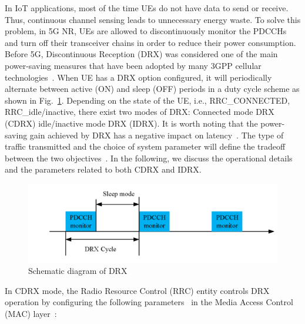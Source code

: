 \documentclass[]{IEEEtran}
\begin{document}
In IoT applications, most of the time UEs do not have data to send or receive. Thus, continuous channel sensing leads to unnecessary energy waste. 
To solve this problem, in 5G NR, UEs are allowed to discontinuously monitor the PDCCHs and turn off their transceiver chains in order to reduce their power consumption. 
Before 5G, Discontinuous Reception (DRX) was considered one of the main power-saving measures that have been adopted by many 3GPP cellular technologies~\cite{TS_36.321, TS_36.304}.
When UE has a DRX option configured, it will periodically alternate between active (ON) and sleep (OFF) periods in a duty cycle scheme as shown in Fig.~\ref{fig:5g-drx}. 
Depending on the state of the UE, i.e., RRC\_CONNECTED, RRC\_idle/inactive, there exist two modes of DRX: Connected mode DRX (CDRX) idle/inactive mode DRX (IDRX).
It is worth noting that the power-saving gain achieved by DRX has a negative impact on latency~\cite{paris2022adaptive}.
The type of traffic transmitted and the choice of system parameter will define the tradeoff between the two objectives~\cite{koc2014device}.
In the following, we discuss the operational details and the parameters related to both CDRX and IDRX.
\begin{figure}
    \centering
    \includegraphics[width=\linewidth]{Pictures/Schematic diagram of DRX.png}
    \caption{Schematic diagram of DRX}
    \label{fig:5g-drx}
\end{figure}


    In CDRX mode, the Radio Resource Control (RRC) entity controls DRX operation by configuring the following parameters~\cite{3gpp_nr_nodate-3_38.331} in the Media Access Control (MAC) layer~\cite{TS_38.321}:
\end{document}
